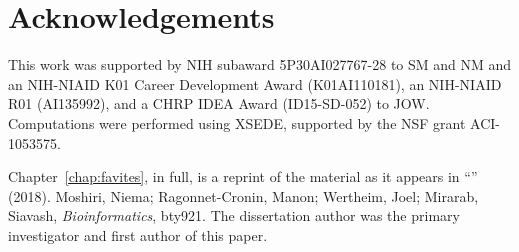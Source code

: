 \section{Acknowledgements}
This work was supported by NIH subaward 5P30AI027767-28 to SM and NM and an NIH-NIAID K01 Career Development Award (K01AI110181), an NIH-NIAID R01 (AI135992), and a \gls{CHRP} IDEA Award (ID15-SD-052) to JOW. Computations were performed using XSEDE, supported by the NSF grant ACI-1053575.

Chapter~\ref{chap:favites}, in full, is a reprint of the material as it appears in ``\favitestitle'' (2018). Moshiri, Niema; Ragonnet-Cronin, Manon; Wertheim, Joel; Mirarab, Siavash, \textit{Bioinformatics}, bty921. The dissertation author was the primary investigator and first author of this paper.

